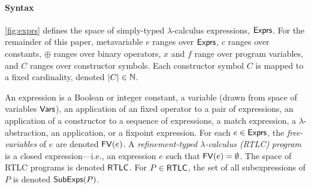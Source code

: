 \paragraph{Syntax}
\autoref{fig:exprs} defines the space of
simply-typed $\lambda$-calculus expressions, $\mathsf{Exprs}$.
%
For the remainder of this paper, metavariable $e$ ranges over
$\mathsf{Exprs}$, %
$c$ ranges over constants, %
$\oplus$ ranges over binary operators, $x$ and $f$ range over
program variables, and $C$ ranges over constructor symbols.
%
Each constructor symbol $C$ is mapped to a fixed cardinality, denoted
$|C| \in \mathbb{N}$.

An expression is a Boolean or integer constant, %
a variable (drawn from space of variables $\mathsf{Vars}$), %
an application of an fixed operator to a pair of expressions, %
an application of a constructor to a sequence of expressions, %
a match expression, %
a $\lambda$-abstraction, %
an application, or %
a fixpoint expression.
%
For each $e \in \mathsf{Exprs}$, the \emph{free-variables} of $e$ are denoted
$\mathsf{FV}(e)$.
%
A \emph{refinement-typed $\lambda$-calculus (RTLC)} \emph{program} is
a closed expression---i.e., an expression $e$ such that $\mathsf{FV}(e)
= \emptyset$.
%
The space of RTLC programs is denoted $\mathsf{RTLC}$.
%
For $P \in \mathsf{RTLC}$, the set of all subexpressions of $P$ is denoted
$\mathsf{SubExps}(P)$.

